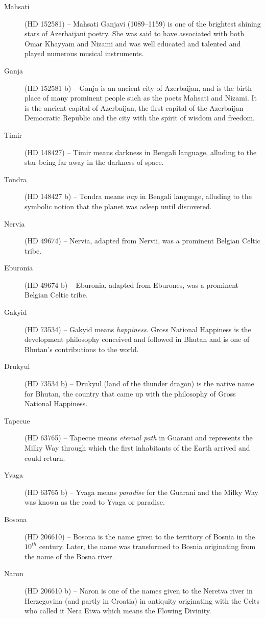 \begin{description}
\item[Mahsati] (HD 152581) -- Mahsati Ganjavi (1089--1159) is one of the brightest shining stars of Azerbaijani poetry. She was said to have associated with both Omar Khayyam and Nizami and was well educated and talented and played numerous musical instruments.
\item[Ganja] (HD 152581 b) -- Ganja is an ancient city of Azerbaijan, and is the birth place of many prominent people such as the poets Mahsati and Nizami. It is the ancient capital of Azerbaijan, the first capital of the Azerbaijan Democratic Republic and the city with the spirit of wisdom and freedom.
\item[Timir] (HD 148427) -- Timir means darkness in Bengali language, alluding to the star being far away in the darkness of space.
\item[Tondra] (HD 148427 b) -- Tondra means \textit{nap} in Bengali language, alluding to the symbolic notion that the planet was asleep until discovered.
\item[Nervia] (HD 49674) -- Nervia, adapted from Nervii, was a prominent Belgian Celtic tribe.
\item[Eburonia] (HD 49674 b) -- Eburonia, adapted from Eburones, was a prominent Belgian Celtic tribe.
\item[Gakyid] (HD 73534) -- Gakyid means \textit{happiness}. Gross National Happiness is the development philosophy conceived and followed in Bhutan and is one of Bhutan's contributions to the world.
\item[Drukyul] (HD 73534 b) -- Drukyul (land of the thunder dragon) is the native name for Bhutan, the country that came up with the philosophy of Gross National Happiness.
\item[Tapecue] (HD 63765) -- Tapecue means \textit{eternal path} in Guarani and represents the Milky Way through which the first inhabitants of the Earth arrived and could return.
\item[Yvaga] (HD 63765 b) -- Yvaga means \textit{paradise} for the Guarani and the Milky Way was known as the road to Yvaga or paradise.
\item[Bosona] (HD 206610) -- Bosona is the name given to the territory of Bosnia in the $10^{th}$ century. Later, the name was transformed to Bosnia originating from the name of the Bosna river.
\item[Naron] (HD 206610 b) -- Naron is one of the names given to the Neretva river in Herzegovina (and partly in Croatia) in antiquity originating with the Celts who called it Nera Etwa which means the Flowing Divinity.

\end{description}
